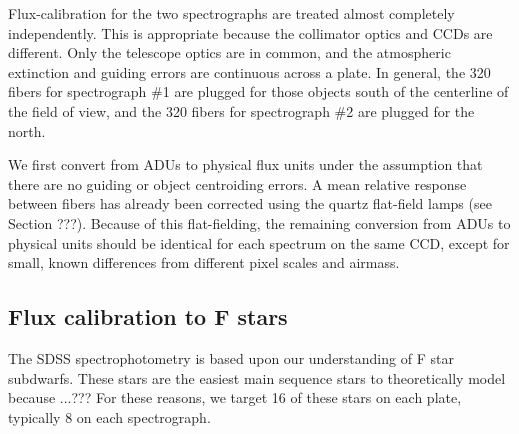 \documentclass[12pt,preprint]{aastex}
\newcommand{\ergs}{{\rm ~erg~s}^{-1}}
\newcommand{\ergscmang}{{\rm ~erg~s}^{-1}{\rm cm}^{-2}{\rm\AA}^{-1}}
\begin{document}
Flux-calibration for the two spectrographs are treated almost completely
independently.  This is appropriate because the collimator optics
and CCDs are different.  Only the telescope optics are in common, and the
atmospheric extinction and guiding errors are continuous across a plate.
In general, the 320 fibers for spectrograph \#1 are plugged for those
objects south of the centerline of the field of view, and the 320 fibers
for spectrograph \#2 are plugged for the north.


We first convert from ADUs to physical flux units under the
assumption that there are no guiding or object centroiding errors.
A mean relative response between fibers has already been corrected
using the quartz flat-field lamps (see Section ???).
Because of this flat-fielding, the remaining conversion from ADUs
to physical units should be identical for each spectrum on the 
same CCD, except for small, known differences from different pixel scales
and airmass.

\subsection{Flux calibration to F stars}

The SDSS spectrophotometry is based upon our understanding
of F star subdwarfs.  These stars are the easiest main sequence
stars to theoretically model because ...???
For these reasons, we target 16 of these stars on each plate,
typically 8 on each spectrograph.


\end{document}
